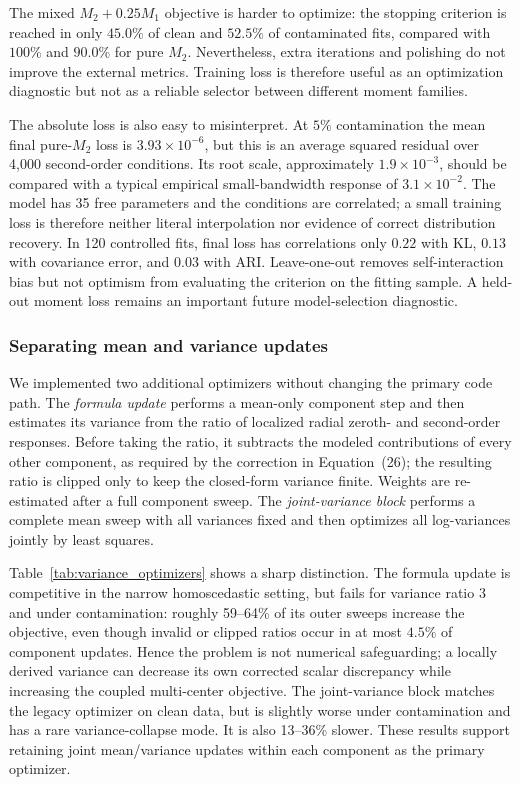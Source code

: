 \documentclass[11pt,a4paper]{article}
\newcommand{\Mone}{M_1}
\newcommand{\Mtwo}{M_2}
\begin{document}
The mixed $\Mtwo+0.25\Mone$ objective is harder to optimize: the stopping
criterion is reached in only $45.0\%$ of clean and $52.5\%$ of contaminated
fits, compared with $100\%$ and $90.0\%$ for pure $\Mtwo$.  Nevertheless,
extra iterations and polishing do not improve the external metrics.  Training
loss is therefore useful as an optimization diagnostic but not as a reliable
selector between different moment families.

The absolute loss is also easy to misinterpret.  At $5\%$ contamination the
mean final pure-$\Mtwo$ loss is $3.93\times10^{-6}$, but this is an average
squared residual over 4,000 second-order conditions.  Its root scale,
approximately $1.9\times10^{-3}$, should be compared with a typical empirical
small-bandwidth response of $3.1\times10^{-2}$.  The model has 35 free
parameters and the conditions are correlated; a small training loss is
therefore neither literal interpolation nor evidence of correct distribution
recovery.  In 120 controlled fits, final loss has correlations only $0.22$
with KL, $0.13$ with covariance error, and $0.03$ with ARI.  Leave-one-out
removes self-interaction bias but not optimism from evaluating the criterion
on the fitting sample.  A held-out moment loss remains an important future
model-selection diagnostic.

\subsubsection{Separating mean and variance updates}

We implemented two additional optimizers without changing the primary code
path.  The \emph{formula update} performs a mean-only component step and then
estimates its variance from the ratio of localized radial zeroth- and
second-order responses.  Before taking the ratio, it subtracts the modeled
contributions of every other component, as required by the correction in
Equation~(26); the resulting ratio is clipped only to keep the closed-form
variance finite.  Weights are re-estimated after a full component sweep.  The
\emph{joint-variance block} performs a complete mean sweep with all variances
fixed and then optimizes all log-variances jointly by least squares.

Table~\ref{tab:variance_optimizers} shows a sharp distinction.  The formula
update is competitive in the narrow homoscedastic setting, but fails for
variance ratio $3$ and under contamination: roughly 59--64\% of its outer
sweeps increase the objective, even though invalid or clipped ratios occur in
at most $4.5\%$ of component updates.  Hence the problem is not numerical
safeguarding; a
locally derived variance can decrease its own corrected scalar discrepancy
while increasing the coupled multi-center objective.  The joint-variance
block matches the legacy optimizer on clean data, but is slightly worse under
contamination and has a rare variance-collapse mode.  It is also 13--36\%
slower.  These results support retaining joint mean/variance updates within
each component as the primary optimizer.
\end{document}
